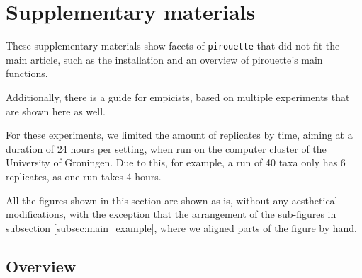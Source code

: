 \section{Supplementary materials}

These supplementary materials show facets of \verb;pirouette; that did not
fit the main article, such as the installation and an overview of
pirouette's main functions.

Additionally, there is a guide for empicists, based on multiple experiments
that are shown here as well.

For these experiments, we limited the amount of replicates by time, 
aiming at a duration of
24 hours per setting, when run on the computer cluster of the
University of Groningen. Due to this, for example, a run of 40 taxa only
has 6 replicates, as one run takes 4 hours.

All the figures shown in this section are shown as-is, 
without any aesthetical modifications, with the exception that the arrangement
of the sub-figures in subsection \ref{subsec:main_example},
where we aligned parts of the figure by hand.

\subsection{Overview}

